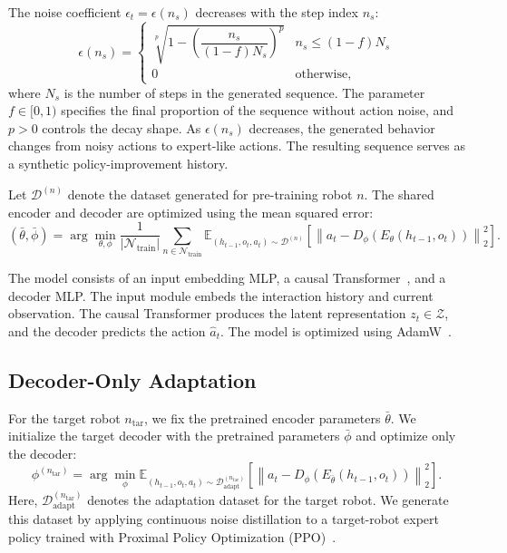 \documentclass[runningheads]{llncs}
\begin{document}
The noise coefficient $\epsilon_t=\epsilon(n_s)$ decreases with the step index $n_s$: 
\begin{equation}
\epsilon(n_s)=
\begin{cases}
\sqrt[p]{1-\left(\dfrac{n_s}{(1-f)N_s}\right)^p}
& n_s\le(1-f)N_s \\
0 & \text{otherwise},
\end{cases}
\end{equation}
where $N_s$ is the number of steps in the generated sequence. 
The parameter $f\in[0,1)$ specifies the final proportion of the sequence without action noise, and $p>0$ controls the decay shape.
As $\epsilon(n_s)$ decreases, the generated behavior changes from noisy actions to expert-like actions.
The resulting sequence serves as a synthetic policy-improvement history.


Let $\mathcal{D}^{(n)}$ denote the dataset generated for pre-training robot $n$.
The shared encoder and decoder are optimized using the mean squared error:
\begin{equation}
\left(
\bar{\theta},
\bar{\phi}
\right)
=
\arg\min_{\theta,\phi}
\frac{1}
{\left|\mathcal{N}_{\mathrm{train}}\right|}
\sum_{n\in\mathcal{N}_{\mathrm{train}}}
\mathbb{E}_{
\left(h_{t-1},o_t,a_t\right)
\sim
\mathcal{D}^{(n)}
}
\left[
\left\|
a_t
-
D_\phi
\left(
E_\theta
\left(
h_{t-1},
o_t
\right)
\right)
\right\|_2^2
\right].
\label{eq:pretrain_obj}
\end{equation}

The model consists of an input embedding MLP, a causal Transformer~\cite{NIPS2017_3f5ee243}, and a decoder MLP. 
The input module embeds the interaction history and current observation.
The causal Transformer produces the latent representation $z_t\in\mathcal{Z}$, and
the decoder predicts the action $\hat{a}_t$. 
The model is optimized using AdamW~\cite{loshchilov2019decoupledweightdecayregularization}.

\subsection{Decoder-Only Adaptation}
For the target robot $n_{\mathrm{tar}}$, we fix the pretrained encoder parameters $\bar{\theta}$.
We initialize the target decoder with the pretrained parameters $\bar{\phi}$ and optimize only the decoder:
\begin{equation}
\phi^{(n_{\mathrm{tar}})}
=
\arg\min_{\phi}
\mathbb{E}_{
\left(h_{t-1},o_t,a_t\right)
\sim
\mathcal{D}_{\mathrm{adapt}}^{(n_{\mathrm{tar}})}
}
\left[
\left\|
a_t
-
D_\phi
\left(
E_{\bar{\theta}}
\left(
h_{t-1},
o_t
\right)
\right)
\right\|_2^2
\right].
\label{eq:adapt_obj}
\end{equation}
Here, $\mathcal{D}_{\mathrm{adapt}}^{(n_{\mathrm{tar}})}$ denotes the adaptation dataset for the target robot.
We generate this dataset by applying continuous noise distillation to a target-robot expert policy trained with Proximal Policy Optimization (PPO)~\cite{schulman2017proximalpolicyoptimizationalgorithms}. 
\end{document}
